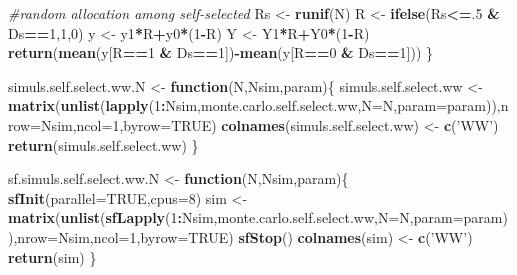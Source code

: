 \documentclass[]{book}
\newenvironment{Shaded}{\begin{snugshade}}{\end{snugshade}}
\newcommand{\CommentTok}[1]{\textcolor[rgb]{0.56,0.35,0.01}{\textit{#1}}}
\newcommand{\ControlFlowTok}[1]{\textcolor[rgb]{0.13,0.29,0.53}{\textbf{#1}}}
\newcommand{\DataTypeTok}[1]{\textcolor[rgb]{0.13,0.29,0.53}{#1}}
\newcommand{\DecValTok}[1]{\textcolor[rgb]{0.00,0.00,0.81}{#1}}
\newcommand{\KeywordTok}[1]{\textcolor[rgb]{0.13,0.29,0.53}{\textbf{#1}}}
\newcommand{\NormalTok}[1]{#1}
\newcommand{\OperatorTok}[1]{\textcolor[rgb]{0.81,0.36,0.00}{\textbf{#1}}}
\newcommand{\OtherTok}[1]{\textcolor[rgb]{0.56,0.35,0.01}{#1}}
\newcommand{\StringTok}[1]{\textcolor[rgb]{0.31,0.60,0.02}{#1}}
\theoremstyle{definition}
\theoremstyle{definition}
\theoremstyle{definition}
\theoremstyle{remark}
\begin{document}
\begin{Shaded}
\begin{Highlighting}[]
  \CommentTok{#random allocation among self-selected}
\NormalTok{  Rs <-}\StringTok{ }\KeywordTok{runif}\NormalTok{(N)}
\NormalTok{  R <-}\StringTok{ }\KeywordTok{ifelse}\NormalTok{(Rs}\OperatorTok{<=}\NormalTok{.}\DecValTok{5} \OperatorTok{&}\StringTok{ }\NormalTok{Ds}\OperatorTok{==}\DecValTok{1}\NormalTok{,}\DecValTok{1}\NormalTok{,}\DecValTok{0}\NormalTok{)}
\NormalTok{  y <-}\StringTok{ }\NormalTok{y1}\OperatorTok{*}\NormalTok{R}\OperatorTok{+}\NormalTok{y0}\OperatorTok{*}\NormalTok{(}\DecValTok{1}\OperatorTok{-}\NormalTok{R)}
\NormalTok{  Y <-}\StringTok{ }\NormalTok{Y1}\OperatorTok{*}\NormalTok{R}\OperatorTok{+}\NormalTok{Y0}\OperatorTok{*}\NormalTok{(}\DecValTok{1}\OperatorTok{-}\NormalTok{R)}
  \KeywordTok{return}\NormalTok{(}\KeywordTok{mean}\NormalTok{(y[R}\OperatorTok{==}\DecValTok{1} \OperatorTok{&}\StringTok{ }\NormalTok{Ds}\OperatorTok{==}\DecValTok{1}\NormalTok{])}\OperatorTok{-}\KeywordTok{mean}\NormalTok{(y[R}\OperatorTok{==}\DecValTok{0} \OperatorTok{&}\StringTok{ }\NormalTok{Ds}\OperatorTok{==}\DecValTok{1}\NormalTok{]))}
\NormalTok{\}}

\NormalTok{simuls.self.select.ww.N <-}\StringTok{ }\ControlFlowTok{function}\NormalTok{(N,Nsim,param)\{}
\NormalTok{  simuls.self.select.ww <-}\StringTok{ }\KeywordTok{matrix}\NormalTok{(}\KeywordTok{unlist}\NormalTok{(}\KeywordTok{lapply}\NormalTok{(}\DecValTok{1}\OperatorTok{:}\NormalTok{Nsim,monte.carlo.self.select.ww,}\DataTypeTok{N=}\NormalTok{N,}\DataTypeTok{param=}\NormalTok{param)),}\DataTypeTok{nrow=}\NormalTok{Nsim,}\DataTypeTok{ncol=}\DecValTok{1}\NormalTok{,}\DataTypeTok{byrow=}\OtherTok{TRUE}\NormalTok{)}
  \KeywordTok{colnames}\NormalTok{(simuls.self.select.ww) <-}\StringTok{ }\KeywordTok{c}\NormalTok{(}\StringTok{'WW'}\NormalTok{)}
  \KeywordTok{return}\NormalTok{(simuls.self.select.ww)}
\NormalTok{\}}

\NormalTok{sf.simuls.self.select.ww.N <-}\StringTok{ }\ControlFlowTok{function}\NormalTok{(N,Nsim,param)\{}
  \KeywordTok{sfInit}\NormalTok{(}\DataTypeTok{parallel=}\OtherTok{TRUE}\NormalTok{,}\DataTypeTok{cpus=}\DecValTok{8}\NormalTok{)}
\NormalTok{  sim <-}\StringTok{ }\KeywordTok{matrix}\NormalTok{(}\KeywordTok{unlist}\NormalTok{(}\KeywordTok{sfLapply}\NormalTok{(}\DecValTok{1}\OperatorTok{:}\NormalTok{Nsim,monte.carlo.self.select.ww,}\DataTypeTok{N=}\NormalTok{N,}\DataTypeTok{param=}\NormalTok{param)),}\DataTypeTok{nrow=}\NormalTok{Nsim,}\DataTypeTok{ncol=}\DecValTok{1}\NormalTok{,}\DataTypeTok{byrow=}\OtherTok{TRUE}\NormalTok{)}
  \KeywordTok{sfStop}\NormalTok{()}
  \KeywordTok{colnames}\NormalTok{(sim) <-}\StringTok{ }\KeywordTok{c}\NormalTok{(}\StringTok{'WW'}\NormalTok{)}
  \KeywordTok{return}\NormalTok{(sim)}
\NormalTok{\}}


\end{Highlighting}
\end{Shaded}
\end{document}
